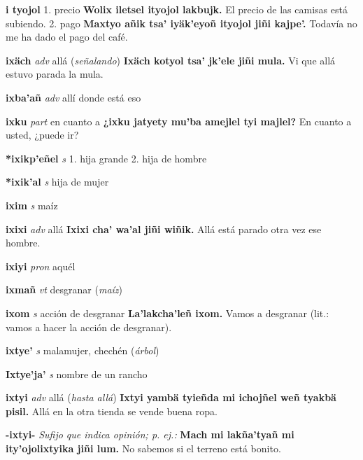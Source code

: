\documentclass[10pt]{scrbook}
\newcommand{\entry}[1]{\textbf{#1}}
\newcommand{\onedefinition}[1]{#1.}
\newcommand{\nontranslationdef}[1]{\textit{#1}}
\newcommand{\partofspeech}[1]{\textit{#1}}
\newcommand{\spanishtranslation}[1]{#1}
\newcommand{\clarification}[1]{(\textit{#1})}
\newcommand{\cholexample}[1]{\textbf{#1}}
\newcommand{\exampletranslation}[1]{#1}
\begin{document}
\begin{multicols}{2}
\entry{i tyojol}
\onedefinition{1}
\spanishtranslation{precio}
\cholexample{Wolix iletsel ityojol lakbujk.}
\exampletranslation{El precio de las camisas está subiendo.}
\onedefinition{2}
\spanishtranslation{pago}
\cholexample{Maxtyo añik tsa' iyäk'eyoñ ityojol jiñi kajpe'.}
\exampletranslation{Todavía no me ha dado el pago del café.}

\entry{ixäch}
\partofspeech{adv}
\spanishtranslation{allá}
\clarification{señalando}
\cholexample{Ixäch kotyol tsa' jk'ele jiñi mula.}
\exampletranslation{Vi que allá estuvo parada la mula.}

\entry{ixba'añ}
\partofspeech{adv}
\spanishtranslation{allí donde está eso}

\entry{ixku}
\partofspeech{part}
\spanishtranslation{en cuanto a}
\cholexample{¿ixku jatyety mu'ba amejlel tyi majlel?}
\exampletranslation{En cuanto a usted, ¿puede ir?}

\entry{*ixikp'eñel}
\partofspeech{s}
\onedefinition{1}
\spanishtranslation{hija grande}
\onedefinition{2}
\spanishtranslation{hija de hombre}

\entry{*ixik'al}
\partofspeech{s}
\spanishtranslation{hija de mujer}

\entry{ixim}
\partofspeech{s}
\spanishtranslation{maíz}

\entry{ixixi}
\partofspeech{adv}
\spanishtranslation{allá}
\cholexample{Ixixi cha' wa'al jiñi wiñik.}
\exampletranslation{Allá está parado otra vez ese hombre.}

\entry{ixiyi}
\partofspeech{pron}
\spanishtranslation{aquél}

\entry{ixmañ}
\partofspeech{vt}
\spanishtranslation{desgranar}
\clarification{maíz}

\entry{ixom}
\partofspeech{s}
\spanishtranslation{acción de desgranar}
\cholexample{La'lakcha'leñ ixom.}
\exampletranslation{Vamos a desgranar (lit.: vamos a hacer la acción de desgranar).}

\entry{ixtye'}
\partofspeech{s}
\spanishtranslation{malamujer, chechén}
\clarification{árbol}

\entry{Ixtye'ja'}
\partofspeech{s}
\spanishtranslation{nombre de un rancho}

\entry{ixtyi}
\partofspeech{adv}
\spanishtranslation{allá}
\clarification{hasta allá}
\cholexample{Ixtyi yambä tyieñda mi ichojñel weñ tyakbä pisil.}
\exampletranslation{Allá en la otra tienda se vende buena ropa.}

\entry{-ixtyi-}
\nontranslationdef{Sufijo que indica opinión; p. ej.:}
\cholexample{Mach mi lakña'tyañ mi ity'ojolixtyika jiñi lum.}
\exampletranslation{No sabemos si el terreno está bonito.}


\end{multicols}
\end{document}
